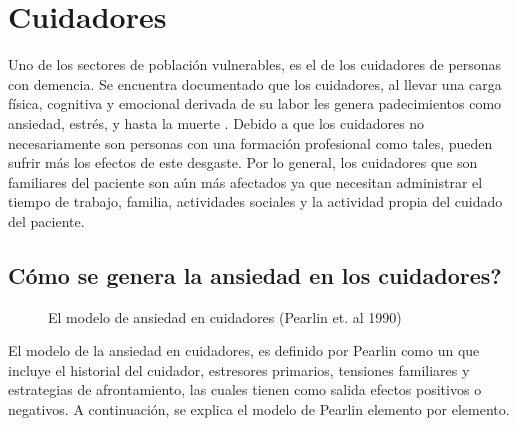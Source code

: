 \section{Cuidadores}\label{secc:caregivers}
Uno de los sectores de poblaci\'on vulnerables, es el de los cuidadores de personas con demencia. Se encuentra documentado que los cuidadores, al llevar una carga f\'isica, cognitiva y emocional derivada de su labor les genera padecimientos como ansiedad, estr\'es, y hasta la muerte \citep{Chen2013}. Debido a que los cuidadores no necesariamente son personas con una formaci\'on profesional como tales, pueden sufrir m\'as los efectos de este desgaste. Por lo general, los cuidadores que son familiares del paciente son a\'un m\'as afectados ya que necesitan administrar el tiempo de trabajo, familia, actividades sociales y la actividad propia del cuidado del paciente.

\subsection{C\'omo se genera la ansiedad en los cuidadores?}\label{secc:caregiverburden}

\begin{figure}[h]
	\centering
	\caption{El modelo de ansiedad en cuidadores (Pearlin et. al 1990)} \label{fig:modeloAnsiedad}
\end{figure}
El modelo de la ansiedad en cuidadores, es definido por Pearlin como un que incluye el historial del cuidador, estresores primarios, tensiones familiares y estrategias de afrontamiento, las cuales tienen como salida efectos positivos o negativos\citep{Pearlin01101990}. A continuaci\'on, se explica el modelo de Pearlin elemento por elemento.
